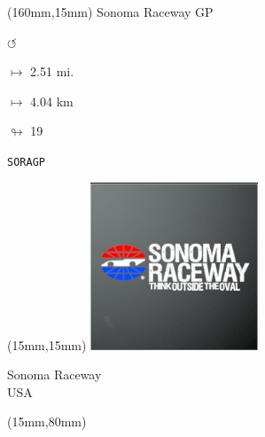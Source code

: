 \begin{textblock*}{40mm}(160mm,15mm)%
Sonoma Raceway GP
\par \Huge$\circlearrowleft$
\Large
\par$\mapsto$ 2.51 mi.
\par$\mapsto$ 4.04 km
\par$\looparrowright$ 19
\par\hfill\tiny\tt SORAGP\\
\end{textblock*}
\null\newpage

\begin{textblock*}{50mm}(15mm,15mm)%
\includegraphics[width=50mm]{LG/2015-05-20_00096.png}
\par Sonoma Raceway\\ USA
\end{textblock*}
\begin{textblock*}{185mm}(15mm,80mm)%
\end{textblock*}

